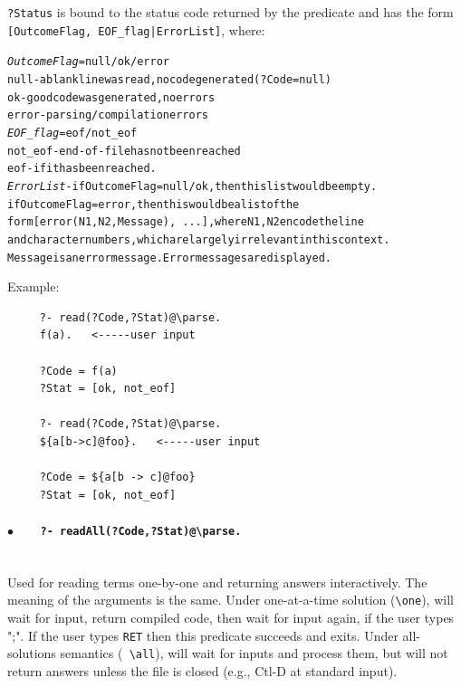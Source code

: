 \documentclass[11pt]{article}
\newcommand{\bs}{\textbackslash}
\begin{document}
{\tt ?Status} is bound to the status code returned by the predicate and has
the form {\tt [OutcomeFlag, EOF\_flag|ErrorList]}, where:
\begin{alltt}
{\rm \emph{OutcomeFlag} = null/ok/error
                  null  - a blank line was read, no code generated (?Code = null)
                  ok    - good code was generated, no errors
                  error - parsing/compilation errors
  \emph{EOF\_flag} = eof/not\_eof
                  not\_eof -  end-of-file has not been reached
                  eof       -  if it has been reached. 
  \emph{ErrorList} - if OutcomeFlag=null/ok, then this list would be empty.
                  if OutcomeFlag=error, then this would be a list of the
                        form {\tt [error(N1,N2,Message), ...]}, where N1, N2 encode the line
                        and character numbers, which are largely irrelevant in this context.
                        Message is an error message. Error messages are displayed.}
\end{alltt}
  Example:
\begin{verbatim}
     ?- read(?Code,?Stat)@\parse.
     f(a).   <-----user input

     ?Code = f(a)
     ?Stat = [ok, not_eof]

     ?- read(?Code,?Stat)@\parse.
     ${a[b->c]@foo}.   <-----user input

     ?Code = ${a[b -> c]@foo}
     ?Stat = [ok, not_eof]
\end{verbatim}
  \paragraph{$\bullet$~~~ \tt ?- readAll(?Code,?Stat)@\bs{}parse.} ~~\\
  Used for reading terms one-by-one and returning answers interactively.
  The meaning of the arguments is the same.  Under one-at-a-time solution
  ({\tt \bs{}one}), will wait for input, return compiled code, then wait for
  input again, if the user types ";". If the user types {\tt RET} then this
  predicate succeeds and exits.  Under all-solutions semantics ({\tt
    \bs{}all}), will wait for inputs and process them, but will not return
  answers unless the file is closed (e.g., Ctl-D at standard input).
\end{document}
